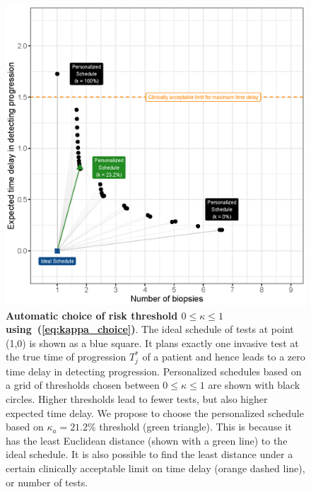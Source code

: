 \begin{figure}
\centerline{\includegraphics{images/kappa_choice_102.eps}}
\caption{\textbf{Automatic choice of risk threshold $0 \leq \kappa \leq 1$ using~(\ref{eq:kappa_choice})}. The ideal schedule of tests at point (1,0) is shown as a blue square. It plans exactly one invasive test at the true time of progression $T^*_j$ of a patient and hence leads to a zero time delay in detecting progression. Personalized schedules based on a grid of thresholds chosen between $0 \leq \kappa \leq 1$ are shown with black circles. Higher thresholds lead to fewer tests, but also higher expected time delay. We propose to choose the personalized schedule based on $\kappa_a=21.2\%$ threshold (green triangle). This is because it has the least Euclidean distance (shown with a green line) to the ideal schedule. It is also possible to find the least distance under a certain clinically acceptable limit on time delay (orange dashed line), or number of tests.}
\label{fig:kappa_choice}
\end{figure}